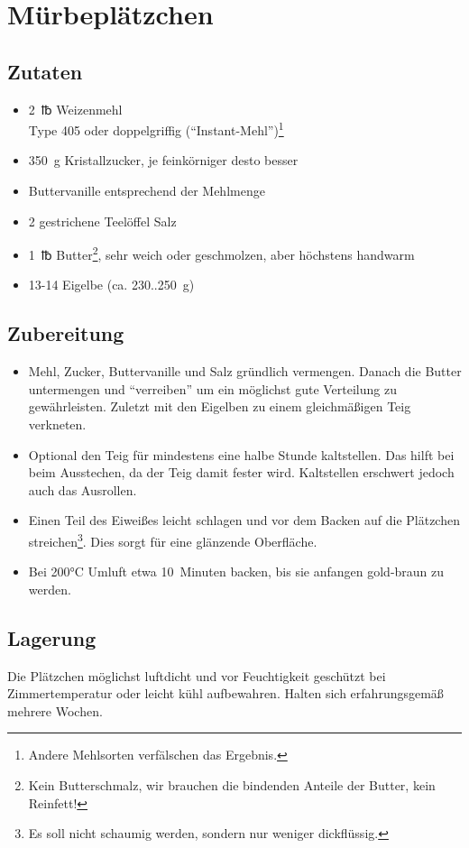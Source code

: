 \documentclass[version=last,paper=A4]{scrartcl}
\begin{document}
\thispagestyle{empty}

\section*{Mürbeplätzchen}

\subsection*{Zutaten}

\begin{itemize}
    \item 2~℔ Weizenmehl\\
    Type 405 oder doppelgriffig (\enquote{Instant-Mehl})\footnote{Andere Mehlsorten verfälschen das Ergebnis.}
    \item 350~g Kristallzucker, je feinkörniger desto besser
    \item Buttervanille entsprechend der Mehlmenge
    \item 2 gestrichene Teelöffel Salz
    \item 1~℔ Butter\footnote{Kein Butterschmalz, wir brauchen die bindenden Anteile der Butter, kein Reinfett!}, sehr weich oder geschmolzen, aber höchstens handwarm
    \item 13-14 Eigelbe (ca. 230..250~g)
\end{itemize}

\subsection*{Zubereitung}

\begin{itemize}
    \item Mehl, Zucker, Buttervanille und Salz gründlich vermengen. Danach die Butter untermengen und \enquote{verreiben} um ein möglichst gute Verteilung zu gewährleisten. Zuletzt mit den Eigelben zu einem gleichmäßigen Teig verkneten.
    \item Optional den Teig für mindestens eine halbe Stunde kaltstellen. Das hilft bei beim Ausstechen, da der Teig damit fester wird. Kaltstellen erschwert jedoch auch das Ausrollen.
    \item Einen Teil des Eiweißes leicht schlagen und vor dem Backen auf die Plätzchen streichen\footnote{Es soll nicht schaumig werden, sondern nur weniger dickflüssig.}. Dies sorgt für eine glänzende Oberfläche.
    \item Bei 200°C Umluft etwa 10~Minuten backen, bis sie anfangen gold-braun zu werden.
\end{itemize}

\subsection*{Lagerung}

Die Plätzchen möglichst luftdicht und vor Feuchtigkeit geschützt bei Zimmertemperatur oder leicht kühl aufbewahren. Halten sich erfahrungsgemäß mehrere Wochen.
\end{document}
